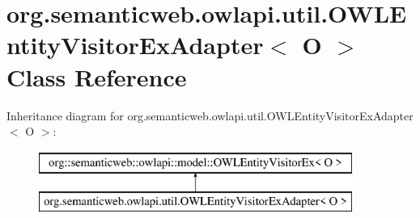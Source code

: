 \hypertarget{classorg_1_1semanticweb_1_1owlapi_1_1util_1_1_o_w_l_entity_visitor_ex_adapter_3_01_o_01_4}{\section{org.\-semanticweb.\-owlapi.\-util.\-O\-W\-L\-Entity\-Visitor\-Ex\-Adapter$<$ O $>$ Class Reference}
\label{classorg_1_1semanticweb_1_1owlapi_1_1util_1_1_o_w_l_entity_visitor_ex_adapter_3_01_o_01_4}
}
Inheritance diagram for org.\-semanticweb.\-owlapi.\-util.\-O\-W\-L\-Entity\-Visitor\-Ex\-Adapter$<$ O $>$\-:\begin{figure}[H]
\begin{center}
\leavevmode
\includegraphics[height=2.000000cm]{classorg_1_1semanticweb_1_1owlapi_1_1util_1_1_o_w_l_entity_visitor_ex_adapter_3_01_o_01_4}
\end{center}
\end{figure}

